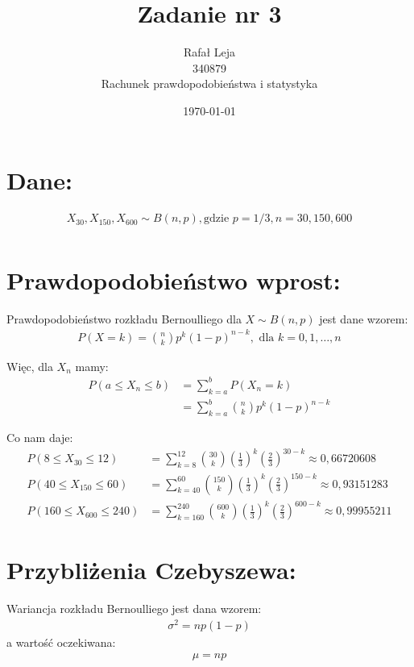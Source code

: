 \documentclass[12pt,fleqn]{article}
\title{\textbf{Zadanie nr 3}}
\author{Rafał Leja \\
340879 \\
Rachunek prawdopodobieństwa i statystyka}
\date{\today}
\begin{document}
\maketitle

\section*{Dane:}

\begin{align*}
    X_{30}, X_{150}, X_{600} \sim  B(n,p), \text{gdzie } p = 1/3, n = 30, 150, 600 \\
\end{align*}

\section*{Prawdopodobieństwo wprost:}

Prawdopodobieństwo rozkładu Bernoulliego dla $X \sim B(n,p)$ jest dane wzorem:
\begin{align*}
    P(X = k) = \binom{n}{k} p^k (1-p)^{n-k}, \text{ dla } k = 0, 1, \ldots, n
\end{align*}

Więc, dla $X_{n}$ mamy:
\begin{align*}
    P(a \leq  X_n \leq  b) &= \sum_{k=a}^{b} P(X_n = k) \\
    &= \sum_{k=a}^{b} \binom{n}{k} p^k (1-p)^{n-k}
\end{align*}

Co nam daje:
\begin{align*}
    P(8 \leq  X_{30} \leq  12) &= \sum_{k=8}^{12} \binom{30}{k} \left(\frac{1}{3}\right)^k \left(\frac{2}{3}\right)^{30-k} \approx 0,66720608 \\
    P(40 \leq X_{150} \leq  60) &= \sum_{k=40}^{60} \binom{150}{k} \left(\frac{1}{3}\right)^k \left(\frac{2}{3}\right)^{150-k} \approx 0,93151283 \\
    P(160 \leq  X_{600} \leq  240) &= \sum_{k=160}^{240} \binom{600}{k} \left(\frac{1}{3}\right)^k \left(\frac{2}{3}\right)^{600-k} \approx 0,99955211
\end{align*}


\section*{Przybliżenia Czebyszewa:}

Wariancja rozkładu Bernoulliego jest dana wzorem:
\begin{align*}
    \sigma^2 = np(1-p)
\end{align*}
a wartość oczekiwana:
\begin{align*}
    \mu = np
\end{align*}
\end{document}
